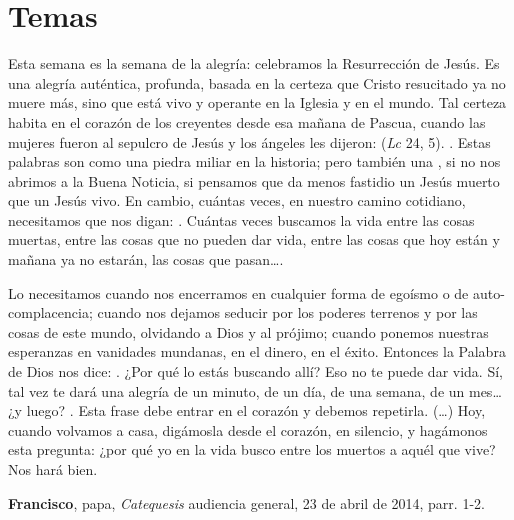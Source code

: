 \newsection
\section{Temas}

\begin{patercite}
Esta semana es la semana de la alegría: celebramos la Resurrección de Jesús. Es una alegría auténtica, profunda, basada en la certeza que Cristo resucitado ya no muere más, sino que está vivo y operante en la Iglesia y en el mundo. Tal certeza habita en el corazón de los creyentes desde esa mañana de Pascua, cuando las mujeres fueron al sepulcro de Jesús y los ángeles les dijeron:  (\emph{Lc} 24, 5). . Estas palabras son como una piedra miliar en la historia; pero también una , si no nos abrimos a la Buena Noticia, si pensamos que da menos fastidio un Jesús muerto que un Jesús vivo. En cambio, cuántas veces, en nuestro camino cotidiano, necesitamos que nos digan: . Cuántas veces buscamos la vida entre las cosas muertas, entre las cosas que no pueden dar vida, entre las cosas que hoy están y mañana ya no estarán, las cosas que pasan\ldots {}.

Lo necesitamos cuando nos encerramos en cualquier forma de egoísmo o de auto-complacencia; cuando nos dejamos seducir por los poderes terrenos y por las cosas de este mundo, olvidando a Dios y al prójimo; cuando ponemos nuestras esperanzas en vanidades mundanas, en el dinero, en el éxito. Entonces la Palabra de Dios nos dice: . ¿Por qué lo estás buscando allí? Eso no te puede dar vida. Sí, tal vez te dará una alegría de un minuto, de un día, de una semana, de un mes\ldots ¿y luego? . Esta frase debe entrar en el corazón y debemos repetirla. (\ldots) Hoy, cuando volvamos a casa, digámosla desde el corazón, en silencio, y hagámonos esta pregunta: ¿por qué yo en la vida busco entre los muertos a aquél que vive? Nos hará bien.

\textbf{Francisco}, papa, \textit{Catequesis} audiencia general, 23 de abril de 2014, parr. 1-2. 
\end{patercite}


